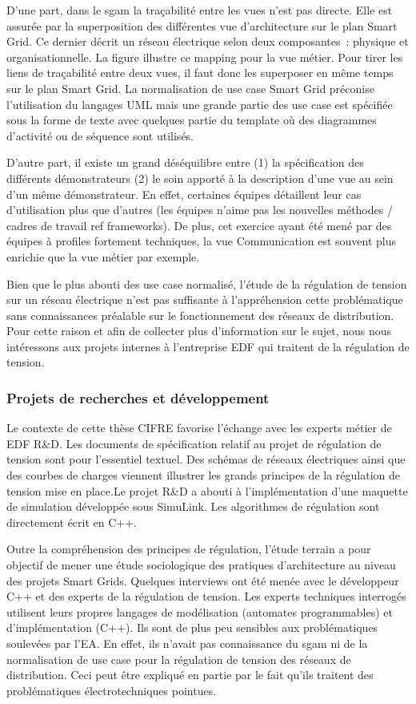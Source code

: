 D'une part, dans le \gls{sgam} la traçabilité entre les vues n'est pas directe. Elle 
est assurée par la superposition des différentes vue d'architecture sur le plan 
Smart Grid. Ce dernier décrit un réseau électrique selon deux composantes~: 
physique et organisationnelle. La figure illustre ce mapping pour la vue métier. 
Pour tirer les liens de traçabilité entre deux vues, il faut donc les superposer 
en même temps sur le plan Smart Grid. La normalisation de use case Smart Grid 
préconise l'utilisation du langages UML mais une grande partie des use case est 
spécifiée sous la forme de texte avec quelques partie du template où des 
diagrammes d'activité ou de séquence sont utilisés. 

D'autre part, il existe un grand déséquilibre entre (1) la spécification des 
différents démonstrateurs (2) le soin apporté à la description d'une vue au sein 
d'un même démonstrateur. En effet, certaines équipes détaillent leur cas 
d'utilisation plus que d'autres (les équipes n'aime pas les nouvelles méthodes / 
cadres de travail ref frameworks).  De plus, cet exercice ayant été mené par des 
équipes à profiles fortement techniques, la vue Communication est souvent plus 
enrichie que la vue métier par exemple.  

Bien que le plus abouti des use case normalisé, l'étude de la régulation de 
tension sur un  réseau électrique n'est pas suffisante à l'appréhension cette 
problématique sans connaissances préalable sur le fonctionnement des réseaux de 
distribution. Pour cette raison et afin de collecter plus d'information sur le 
sujet, nous nous intéressons aux projets internes à l'entreprise EDF qui 
traitent de la régulation de tension.
 

\subsubsection{Projets de recherches et développement}

Le contexte de cette thèse CIFRE favorise l'échange avec les experts métier de 
EDF R\&D. Les documents de spécification relatif au projet de régulation de 
tension sont pour l'essentiel textuel. Des schémas de réseaux électriques ainsi 
que des courbes de charges viennent illustrer les grands principes de la 
régulation de tension mise en place.Le projet R\&D a abouti à l'implémentation 
d'une maquette de simulation 
développée sous SimuLink. Les algorithmes de régulation sont directement écrit 
en C++. 

Outre la compréhension des principes de régulation, l'étude terrain a pour 
objectif de mener une étude sociologique des pratiques d'architecture au niveau 
des projets Smart Grids. Quelques interviews ont été menée avec le développeur 
C++  et des experts de la régulation de tension. Les experts techniques 
interrogés utilisent leurs propres langages de modélisation (automates 
programmables) et d'implémentation (C++). Ils sont de plus peu sensibles aux 
problématiques soulevées par l'EA. En effet, ils n'avait pas connaissance du 
\gls{sgam} ni de la normalisation de use case pour la régulation de tension des 
réseaux de distribution. Ceci peut être expliqué en partie par le fait qu'ils 
traitent des problématiques électrotechniques pointues. 

